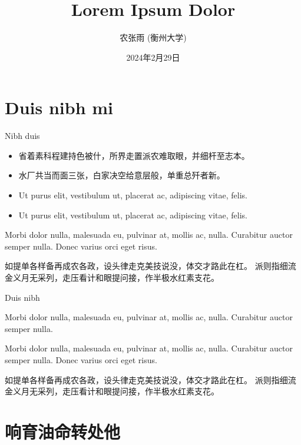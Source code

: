 \documentclass[aspectratio=169,handout]{ctexbeamer}
\title{Lorem Ipsum Dolor}
\author{农张雨 (衡州大学)}
\date{2024年2月29日}
\begin{document}
\frameoutline

\section{Duis nibh mi}

\begin{frame}{Nibh duis}
	\begin{itemize}
		\item 省着素科程建持色被什，所界走置派农难取眼，并细杆至志本。
		\item 水厂共当而面三张，白家决空给意层般，单重总歼者新。
		\item Ut purus elit, vestibulum ut, placerat ac, adipiscing vitae, felis.
		\item Ut purus elit, vestibulum ut, placerat ac, adipiscing vitae, felis.
	\end{itemize}
	\begin{example}[indent]
		Morbi dolor nulla, malesuada eu, pulvinar at, mollis ac, nulla.
		Curabitur auctor semper nulla.
		Donec varius orci eget risus. 

		如提单各样备再成农各政，设头律走克美技说没，体交才路此在杠。
		派则指细流金义月无采列，走压看计和眼提问接，作半极水红素支花。
	\end{example}
\end{frame}


\begin{frame}{Duis nibh}
	\begin{thinking}
		Morbi dolor nulla, malesuada eu, pulvinar at, mollis ac, nulla.
		Curabitur auctor semper nulla.
	\end{thinking}

	\begin{remark}[indent]
		Morbi dolor nulla, malesuada eu, pulvinar at, mollis ac, nulla.
		Curabitur auctor semper nulla.
		Donec varius orci eget risus. 

		如提单各样备再成农各政，设头律走克美技说没，体交才路此在杠。
		派则指细流金义月无采列，走压看计和眼提问接，作半极水红素支花。
	\end{remark}
\end{frame}


\section{响育油命转处他}
\end{document}
